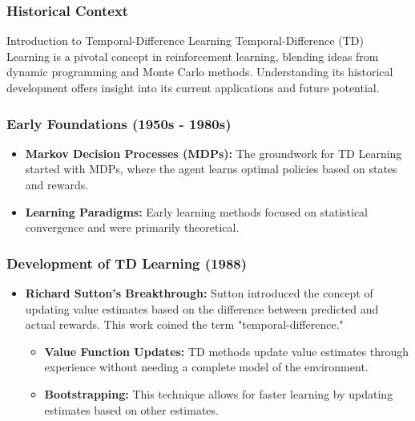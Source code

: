 \documentclass[aspectratio=169]{beamer}
\begin{document}
\begin{frame}[fragile]
    \frametitle{Historical Context}
    \begin{block}{Introduction to Temporal-Difference Learning}
        Temporal-Difference (TD) Learning is a pivotal concept in reinforcement learning, blending ideas from dynamic programming and Monte Carlo methods. Understanding its historical development offers insight into its current applications and future potential.
    \end{block}
\end{frame}

\begin{frame}[fragile]
    \frametitle{Early Foundations (1950s - 1980s)}
    \begin{itemize}
        \item \textbf{Markov Decision Processes (MDPs):} The groundwork for TD Learning started with MDPs, where the agent learns optimal policies based on states and rewards.
        \item \textbf{Learning Paradigms:} Early learning methods focused on statistical convergence and were primarily theoretical.
    \end{itemize}
\end{frame}

\begin{frame}[fragile]
    \frametitle{Development of TD Learning (1988)}
    \begin{itemize}
        \item \textbf{Richard Sutton's Breakthrough:} Sutton introduced the concept of updating value estimates based on the difference between predicted and actual rewards. This work coined the term "temporal-difference."
        \begin{itemize}
            \item \textbf{Value Function Updates:} TD methods update value estimates through experience without needing a complete model of the environment.
            \item \textbf{Bootstrapping:} This technique allows for faster learning by updating estimates based on other estimates.
        \end{itemize}
    \end{itemize}
\end{frame}
\end{document}
